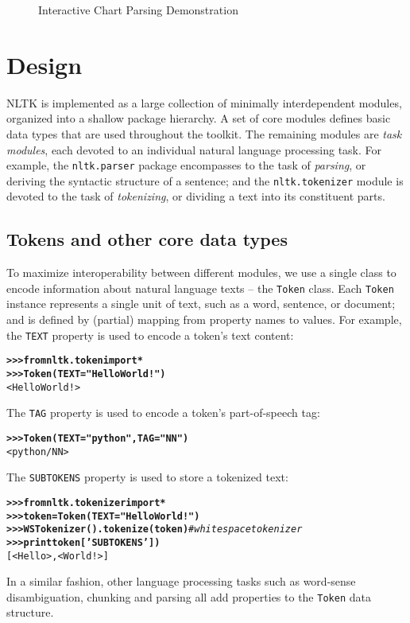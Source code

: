 \documentclass[11pt]{article}
\begin{document}
\begin{figure}[bth]
\caption{Interactive Chart Parsing Demonstration}
\label{fig:chart}
\end{figure}


\section{Design}

NLTK is implemented as a large collection of minimally interdependent
modules, organized into a shallow package hierarchy.  A set of core
modules defines basic data types that are used throughout the toolkit.  
The remaining modules are \emph{task modules}, each devoted to an
individual natural language processing task.  For example, the
\texttt{nltk.parser} package encompasses to the task of
\emph{parsing}, or deriving the syntactic structure of a sentence; and
the \texttt{nltk.tokenizer} module is devoted to the task of
\emph{tokenizing}, or dividing a text into its constituent parts.

\subsection{Tokens and other core data types}

To maximize interoperability between different modules, we use a
single class to encode information about natural language texts -- the
\texttt{Token} class.  Each \texttt{Token} instance represents a
single unit of text, such as a word, sentence, or document; and is
defined by (partial) mapping from property names to values.  For
example, the \texttt{TEXT} property is used to encode a token's text
content:

\begin{alltt}
\textbf{>>> from nltk.token import *}
\textbf{>>> Token(TEXT="Hello World!")}
<Hello World!>
\end{alltt}
%
The \texttt{TAG} property is used to encode a token's part-of-speech
tag:

\begin{alltt}
\textbf{>>> Token(TEXT="python", TAG="NN")}
<python/NN>
\end{alltt}
%
The \texttt{SUBTOKENS} property is used to store a tokenized text:

\begin{alltt}
\textbf{>>> from nltk.tokenizer import *}
\textbf{>>> token = Token(TEXT="Hello World!")}
\textbf{>>> WSTokenizer().tokenize(token)} \textit{\# whitespace tokenizer}
\textbf{>>> print token['SUBTOKENS'])}
[<Hello>, <World!>]
\end{alltt}
%
In a similar fashion, other language processing tasks such as
word-sense disambiguation, chunking and parsing all add properties to
the \texttt{Token} data structure.
\end{document}
